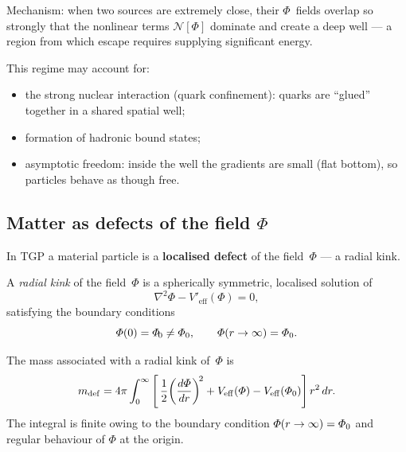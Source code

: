 Mechanism: when two sources are extremely close, their $\Phi$~fields
overlap so strongly that the nonlinear terms $\mathcal{N}[\Phi]$
dominate and create a deep well --- a region from which escape
requires supplying significant energy.

This regime may account for:
\begin{itemize}[nosep]
  \item the strong nuclear interaction (quark confinement): quarks
        are ``glued'' together in a shared spatial well;
  \item formation of hadronic bound states;
  \item asymptotic freedom: inside the well the gradients are small
        (flat bottom), so particles behave as though free.
\end{itemize}

\subsection{Matter as defects of the field $\Phi$}\label{ssec:defekty}

In TGP a material particle is a \textbf{localised defect} of the
field~$\Phi$ --- a radial kink.

\begin{definition}\label{def:kink}
A \emph{radial kink} of the field~$\Phi$ is a spherically symmetric,
localised solution of
\begin{equation}\label{eq:kink}
    \nabla^2\Phi - V'_{\mathrm{eff}}(\Phi) = 0,
\end{equation}
satisfying the boundary conditions
\begin{equation}\label{eq:kink-bc}
    \varPhi(0) = \varPhi_{\!0} \neq \varPhi_0, \qquad
    \varPhi(r\to\infty) = \varPhi_0.
\end{equation}
\end{definition}

\begin{proposition}\label{prop:masa-defektu}
The mass associated with a radial kink of~$\Phi$ is
\begin{equation}\label{eq:masa-defektu}
    m_{\mathrm{def}} = 4\pi \int_0^{\infty}
    \left[\,\frac{1}{2}\!\left(\frac{d\varPhi}{dr}\right)^{\!2}
    + V_{\mathrm{eff}}(\varPhi)
    - V_{\mathrm{eff}}(\varPhi_0)\right] r^2\,dr.
\end{equation}
The integral is finite owing to the boundary condition
$\varPhi(r\to\infty) = \varPhi_0$ and regular behaviour of $\Phi$ at the
origin.
\end{proposition}


